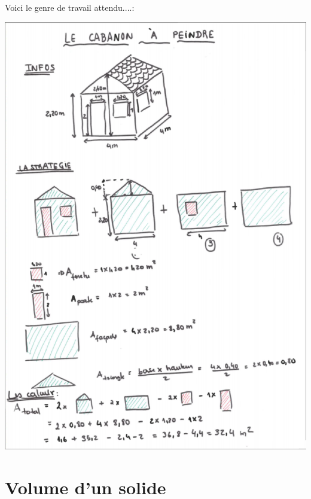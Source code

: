 {\begin{activite}
\begin{partie}[Déroulement]
Voici le genre de travail attendu....:
\begin{center}
\includegraphics[width=14cm]{PerimetresAires/figures/cabanon.eps} 
\end{center}

\end{partie}
\end{activite}
}


\section{Volume d'un solide}

